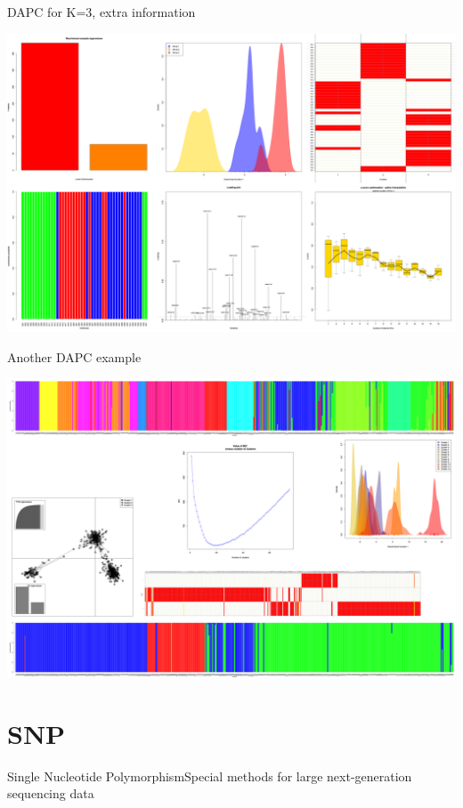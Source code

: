 \documentclass[compress, ucs, xelatex, 11pt, xcolor=svgnames,
  hyperref={
    bookmarks=true,
    unicode=true,
    colorlinks=true,
    pdftitle={Molecular data in R},
    plainpages=false,
    pdfauthor={Vojtech Zeisek},
    pdfsubject={Course about phylogeny and evolution in R},
    pdfcreator={XeLaTeX},
    pdfkeywords={R, evolution, phylogeny, molecular data},
    linkcolor=Tomato,
    anchorcolor=SaddleBrown,
    citecolor=Goldenrod,
    filecolor=DarkMagenta,
    menucolor=Sienna,
    urlcolor=DarkTurquoise,
    pdftex},
  url={hyphens, lowtilde} %
  ]{beamer}
\begin{document}
\begin{frame}{DAPC for K=3, extra information}
  \begin{center}
    \includegraphics[width=\textwidth-1.5cm]{dapc3-extra.png}
  \end{center}
\end{frame}

\begin{frame}{Another DAPC example}
  \begin{center}
    \includegraphics[width=\textwidth-1.5cm]{dapc.png}
  \end{center}
\end{frame}

\section{SNP}

\begin{frame}{Single Nucleotide Polymorphism}{Special methods for large next-generation sequencing data}
  \tableofcontents[currentsection, sectionstyle=show/hide, hideothersubsections]
\end{frame}
\end{document}
